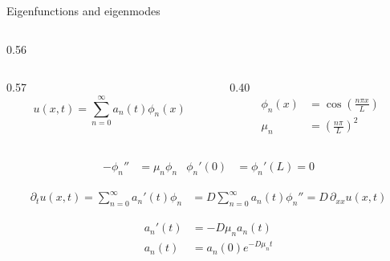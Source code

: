 \begin{frame}{Eigenfunctions and eigenmodes}

  \vspace{-0.24cm}

  \begin{columns}[c,onlytextwidth]

    \begin{column}{0.56\textwidth}

      \begin{columns}[c,totalwidth=\linewidth]
        \begin{column}{0.57\linewidth}
          {\color{HydraWhite}\fontsize{9.2}{11.8}\selectfont
          \[
            u(x,t)=\sum_{n=0}^{\infty}a_n(t)\phi_n(x)
          \]
          }
        \end{column}

        \begin{column}{0.40\linewidth}
          {\color{HydraMuted}\fontsize{6.9}{8.5}\selectfont
          \begin{align*}
            \phi_n(x)
            &=\cos\!\left(\frac{n\pi x}{L}\right)
            \\
            \mu_n
            &=\left(\frac{n\pi}{L}\right)^2
          \end{align*}
          }
        \end{column}
      \end{columns}

      \vspace{-0.38cm}


      {\color{HydraWhite}\fontsize{8.9}{11.5}\selectfont
      \begin{align*}
        -\phi_n'' &= \mu_n\phi_n
        &
        \phi_n'(0)&=\phi_n'(L)=0
      \end{align*}
      }

      \vspace{-0.68cm}


      {\color{HydraWhite}\fontsize{8.8}{11.3}\selectfont
      \begin{align*}
        \partial_t u(x,t) = \sum_{n=0}^{\infty}a_n'(t)\phi_n
        &=D\sum_{n=0}^{\infty}a_n(t)\phi_n'' = D\,\partial_{xx} u(x,t)
      \end{align*}
      }

      \vspace{-0.22cm}

      {\color{HydraWhite}\fontsize{9.6}{12.2}\selectfont
      \[
        \boxed{
          \begin{aligned}
            a_n'(t)&=-D\mu_n a_n(t)
            \\
            a_n(t)&=a_n(0)e^{-D\mu_nt}
          \end{aligned}
        }
      \]
      }


\end{column}
\end{columns}
\end{frame}
